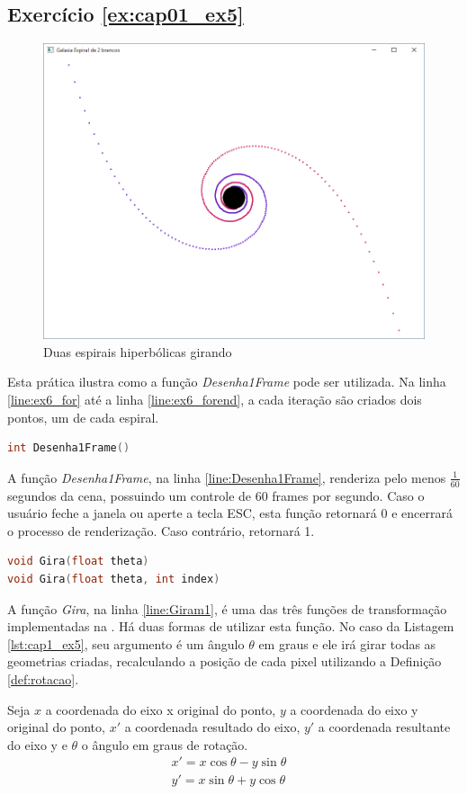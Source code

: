 \subsection*{Exercício \ref{ex:cap01_ex5}}
\begin{figure}[ht]
  \centerline{\includegraphics[width=.5\textwidth]{img/cap1_ex6.png}}
  \caption{Duas espirais hiperbólicas girando}
  \label{fig:cap01_ex5}
\end{figure}
Esta prática ilustra como a função \emph{Desenha1Frame} pode ser utilizada. Na linha \ref{line:ex6_for} até a linha \ref{line:ex6_forend}, a cada iteração são criados dois pontos, um de cada espiral.



\begin{lstlisting}[label={func:Desenha1Frame},language=C++]
int Desenha1Frame()
\end{lstlisting}
A função \emph{Desenha1Frame}, na linha \ref{line:Desenha1Frame}, renderiza pelo menos $\frac{1}{60}$ segundos da cena, possuindo um controle de 60 frames por segundo. Caso o usuário feche a janela ou aperte a tecla ESC, esta função retornará 0 e encerrará o processo de renderização. Caso contrário, retornará 1.

\begin{lstlisting}[label={func:Gira},language=C++]
void Gira(float theta)
void Gira(float theta, int index)
\end{lstlisting}
A função \emph{Gira}, na linha \ref{line:Giram1}, é uma das três funções de transformação implementadas na \playAPC{}. Há duas formas de utilizar esta função. No caso da Listagem \ref{lst:cap1_ex5}, seu argumento é um ângulo $\theta$ em graus e ele irá girar todas as geometrias criadas, recalculando a posição de cada pixel utilizando a Definição \ref{def:rotacao}. 

\begin{myDef} 
Seja $x$ a coordenada do eixo x original do ponto, $y$ a coordenada do eixo y original do ponto, $x'$ a coordenada resultado do eixo, $y'$ a coordenada resultante do eixo y e $\theta$ o ângulo em graus de rotação.
$$
  \begin{matrix}
  x' = x\cos \theta  - y \sin \theta &\\
  y' = x\sin \theta  + y \cos \theta
  \end{matrix}
$$
\label{def:rotacao}
\end{myDef}

